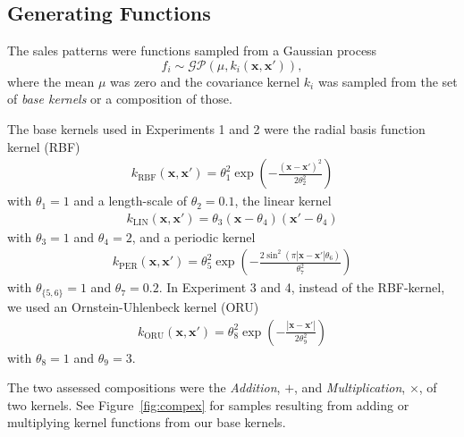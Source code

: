 \documentclass[10pt,letterpaper]{article}
\begin{document}
\subsection{Generating Functions}\label{ssec:genfun}

The sales patterns were functions sampled from a Gaussian process $$f_i \sim \mathcal{GP}(\mu, k_i(\mathbf{x},\mathbf{x'})),$$ where the mean $\mu$ was zero and the covariance kernel $k_i$ was sampled from the set of \textit{base kernels} or a composition of those.

The base kernels used in Experiments 1 and 2 were the radial basis function kernel (RBF)
\begin{align}
k_{\text{RBF}}(\mathbf{x},\mathbf{x}')=\theta_1^2\exp\left(-\frac{(\mathbf{x}-\mathbf{x}')^2}{2\theta_2^2}\right)
\end{align}
with $\theta_1=1$ and a length-scale of $\theta_2=0.1$, the linear kernel
\begin{align}
k_{\text{LIN}}(\mathbf{x},\mathbf{x}')=\theta_3(\mathbf{x}-\theta_4)(\mathbf{x}'-\theta_4)
\end{align}
with $\theta_3=1$ and $\theta_4=2$, and a periodic kernel
\begin{align}
k_{\text{PER}}(\mathbf{x},\mathbf{x}')=\theta_5^2\exp\left(-\frac{2\sin^2(\pi|\mathbf{x}-\mathbf{x}'|\theta_6)}{\theta_{7}^2}\right)
\end{align}
with $\theta_{\{5,6\}}=1$ and $\theta_{7}=0.2$. In Experiment 3 and 4, instead of the RBF-kernel, we used an Ornstein-Uhlenbeck kernel (ORU)
\begin{align}
k_{\text{ORU}}(\mathbf{x},\mathbf{x}')=\theta_8^2\exp\left(-\frac{|\mathbf{x}-\mathbf{x}'|}{2\theta_9^2}\right)
\end{align}
with $\theta_8=1$ and $\theta_9=3$.

The two assessed compositions were the \emph{Addition}, $+$, and \emph{Multiplication}, $\times$, of two kernels. See Figure~\ref{fig:compex} for samples resulting from adding or multiplying kernel functions from our base kernels.
\end{document}

